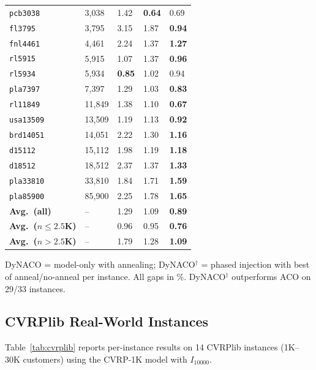 \documentclass[sigconf,nonacm]{acmart}
\begin{document}
\begin{table}[h]
\begin{tabularx}{\columnwidth}{lYYYY}
\midrule
\texttt{pcb3038}  & 3,038 & 1.42 & \textbf{0.64} & 0.69 \\
\texttt{fl3795}   & 3,795 & 3.15 & 1.87 & \textbf{0.94} \\
\texttt{fnl4461}  & 4,461 & 2.24 & 1.37 & \textbf{1.27} \\
\texttt{rl5915}   & 5,915 & 1.07 & 1.37 & \textbf{0.96} \\
\texttt{rl5934}   & 5,934 & \textbf{0.85} & 1.02 & 0.94 \\
\texttt{pla7397}  & 7,397 & 1.29 & 1.03 & \textbf{0.83} \\
\texttt{rl11849}  & 11,849 & 1.38 & 1.10 & \textbf{0.67} \\
\texttt{usa13509} & 13,509 & 1.19 & 1.13 & \textbf{0.92} \\
\texttt{brd14051} & 14,051 & 2.22 & 1.30 & \textbf{1.16} \\
\texttt{d15112}   & 15,112 & 1.98 & 1.19 & \textbf{1.18} \\
\texttt{d18512}   & 18,512 & 2.37 & 1.37 & \textbf{1.33} \\
\texttt{pla33810} & 33,810 & 1.84 & 1.71 & \textbf{1.59} \\
\texttt{pla85900} & 85,900 & 2.25 & 1.78 & \textbf{1.65} \\
\midrule
\textbf{Avg.~(all)} & -- & 1.29 & 1.09 & \textbf{0.89} \\
\textbf{Avg.~($n{\leq}2.5$K)} & -- & 0.96 & 0.95 & \textbf{0.76} \\
\textbf{Avg.~($n{>}2.5$K)} & -- & 1.79 & 1.28 & \textbf{1.09} \\
\bottomrule
\end{tabularx}
\vspace{2pt}

\raggedright\footnotesize{DyNACO = model-only with annealing; DyNACO$^{\dagger}$ = phased injection with best of anneal/no-anneal per instance. All gaps in \%. DyNACO$^{\dagger}$ outperforms ACO on 29/33 instances.}
\end{table}

\subsection{CVRPlib Real-World Instances}
\label{app:cvrplib}

Table~\ref{tab:cvrplib} reports per-instance results on 14 CVRPlib instances (1K--30K customers) using the CVRP-1K model with $I_{10000}$.
\end{document}
